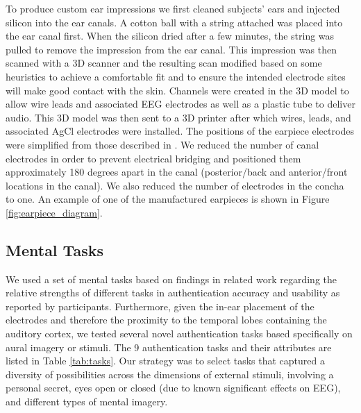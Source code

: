 \documentclass{sigchi}
\begin{document}
To produce custom ear impressions we first cleaned subjects' ears and injected silicon into the ear canals. A cotton ball with a string attached was placed into the ear canal first. When the silicon dried after a few minutes, the string was pulled to remove the impression from the ear canal. This impression was then scanned with a 3D scanner and the resulting scan modified based on some heuristics to achieve a comfortable fit and to ensure the intended electrode sites will make good contact with the skin. Channels were created in the 3D model to allow wire leads and associated EEG electrodes as well as a plastic tube to deliver audio. This 3D model was then sent to a 3D printer after which wires, leads, and associated AgCl electrodes were installed. The positions of the earpiece electrodes were simplified from those described in \cite{Mikkelsen2015}. We reduced the number of canal electrodes in order to prevent electrical bridging and positioned them approximately 180 degrees apart in the canal (posterior/back and anterior/front locations in the canal). We also reduced the number of electrodes in the concha to one. An example of one of the manufactured earpieces is shown in Figure \ref{fig:earpiece_diagram}.

\subsection{Mental Tasks}

We used a set of mental tasks based on findings in related work regarding the relative strengths of different tasks in authentication accuracy and usability as reported by participants. Furthermore, given the in-ear placement of the electrodes and therefore the proximity to the temporal lobes containing the auditory cortex, we tested several novel authentication tasks based specifically on aural imagery or stimuli. The 9 authentication tasks and their attributes are listed in Table \ref{tab:tasks}. Our strategy was to select tasks that captured a diversity of possibilities across the dimensions of external stimuli, involving a personal secret, eyes open or closed (due to known significant effects on EEG), and different types of mental imagery.
\end{document}
